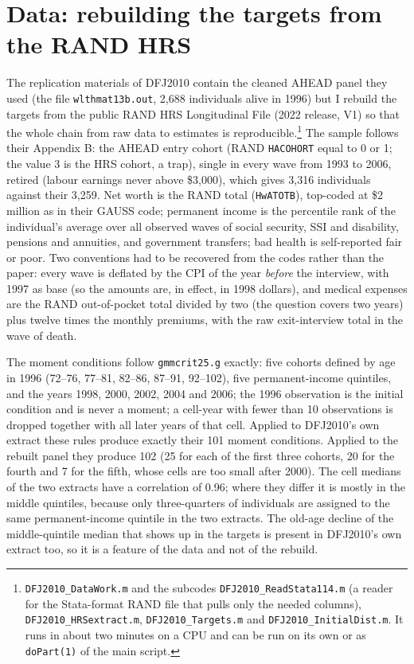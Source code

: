 \documentclass[11pt,fleqn]{article}
\begin{document}
\section{Data: rebuilding the targets from the RAND HRS}\label{sec:data}
The replication materials of DFJ2010 contain the cleaned AHEAD panel they used (the file \texttt{wlthmat13b.out}, 2,688 individuals alive in 1996) but I rebuild the targets from the public RAND HRS Longitudinal File (2022 release, V1) so that the whole chain from raw data to estimates is reproducible.\footnote{\texttt{DFJ2010\_DataWork.m} and the subcodes \texttt{DFJ2010\_ReadStata114.m} (a reader for the Stata-format RAND file that pulls only the needed columns), \texttt{DFJ2010\_HRSextract.m}, \texttt{DFJ2010\_Targets.m} and \texttt{DFJ2010\_InitialDist.m}. It runs in about two minutes on a CPU and can be run on its own or as \texttt{doPart(1)} of the main script.} The sample follows their Appendix B: the AHEAD entry cohort (RAND \texttt{HACOHORT} equal to 0 or 1; the value 3 is the HRS cohort, a trap), single in every wave from 1993 to 2006, retired (labour earnings never above \$3,000), which gives 3,316 individuals against their 3,259. Net worth is the RAND total (\texttt{HwATOTB}), top-coded at \$2 million as in their GAUSS code; permanent income is the percentile rank of the individual's average over all observed waves of social security, SSI and disability, pensions and annuities, and government transfers; bad health is self-reported fair or poor. Two conventions had to be recovered from the codes rather than the paper: every wave is deflated by the CPI of the year \emph{before} the interview, with 1997 as base (so the amounts are, in effect, in 1998 dollars), and medical expenses are the RAND out-of-pocket total divided by two (the question covers two years) plus twelve times the monthly premiums, with the raw exit-interview total in the wave of death.

The moment conditions follow \texttt{gmmcrit25.g} exactly: five cohorts defined by age in 1996 (72--76, 77--81, 82--86, 87--91, 92--102), five permanent-income quintiles, and the years 1998, 2000, 2002, 2004 and 2006; the 1996 observation is the initial condition and is never a moment; a cell-year with fewer than 10 observations is dropped together with all later years of that cell. Applied to DFJ2010's own extract these rules produce exactly their 101 moment conditions. Applied to the rebuilt panel they produce 102 (25 for each of the first three cohorts, 20 for the fourth and 7 for the fifth, whose cells are too small after 2000). The cell medians of the two extracts have a correlation of 0.96; where they differ it is mostly in the middle quintiles, because only three-quarters of individuals are assigned to the same permanent-income quintile in the two extracts. The old-age decline of the middle-quintile median that shows up in the targets is present in DFJ2010's own extract too, so it is a feature of the data and not of the rebuild.
\end{document}

